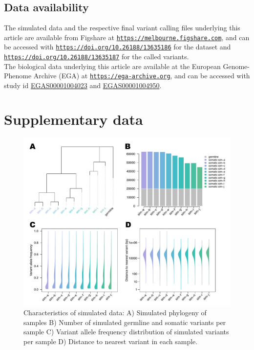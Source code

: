\section*{Data availability}
The simulated data and the respective final variant calling files underlying this article are available from Figshare at \href{https://melbourne.figshare.com}{\nolinkurl{https://melbourne.figshare.com}}, and can be accessed with \href{https://doi.org/10.26188/13635186}{\nolinkurl{https://doi.org/10.26188/13635186}} for the dataset and \href{https://doi.org/10.26188/13635187}{\nolinkurl{https://doi.org/10.26188/13635187}} for the called variants.\\
The biological data underlying this article are available at the European Genome-Phenome Archive (EGA) at \href{https://ega-archive.org}{\nolinkurl{https://ega-archive.org}}, and can be accessed with study id \href{https://ega-archive.org/studies/EGAS00001004023}{EGAS00001004023} and \href{https://ega-archive.org/studies/EGAS00001004950}{EGAS00001004950}.



\chapter*{Supplementary data}
\label{ch:appendixManuscriptSuppData}

\begin{figure}[!ht]
\centering
  \includegraphics[width=\textwidth]{Appendices/Variantcalling/supp/S1}
  \caption[Characteristics of simulated data]{Characteristics of simulated data: A) Simulated phylogeny of samples B) Number of simulated germline and somatic variants per sample C) Variant allele frequency distribution of simulated variants per sample D) Distance to nearest variant in each sample.}\label{A:fig:S01}
\end{figure}

